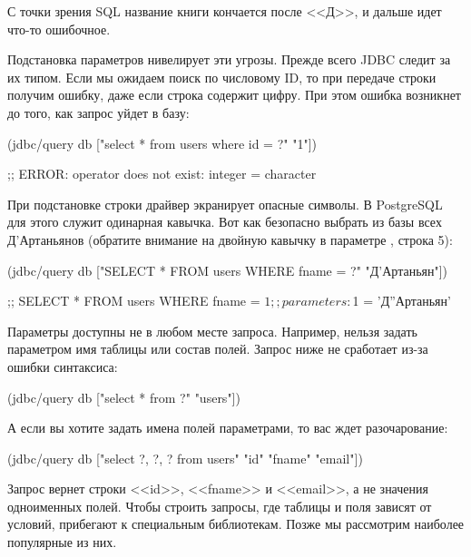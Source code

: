 С точки зрения SQL название книги кончается после <<Д>>, и дальше идет что-то ошибочное.

Подстановка параметров нивелирует эти угрозы. Прежде всего JDBC следит за их типом. Если мы ожидаем поиск по числовому ID, то при передаче строки получим ошибку, даже если строка содержит цифру. При этом ошибка возникнет до того, как запрос уйдет в базу:

\begin{english}
  \begin{clojure}
(jdbc/query db ["select * from users where id = ?" "1"])

;; ERROR: operator does not exist: integer = character
  \end{clojure}
\end{english}

При подстановке строки драйвер экранирует опасные символы. В PostgreSQL для этого служит одинарная кавычка. Вот как безопасно выбрать из базы всех Д'Артаньянов (обратите внимание на двойную кавычку в параметре , строка 5):

  \begin{clojure/lines}
(jdbc/query db
  ["SELECT * FROM users WHERE fname = ?" "Д'Артаньян"])

;; SELECT * FROM users WHERE fname = $1
;; parameters: $1 = 'Д''Артаньян'
  \end{clojure/lines}

Параметры доступны не в любом месте запроса. Например, нельзя задать параметром имя таблицы или состав полей. Запрос ниже не сработает из-за ошибки синтаксиса:

\begin{english}
  \begin{clojure}
(jdbc/query db ["select * from ?" "users"])
  \end{clojure}
\end{english}

А если вы хотите задать имена полей параметрами, то вас ждет разочарование:

\begin{english}
  \begin{clojure}
(jdbc/query db
  ["select ?, ?, ? from users" "id" "fname" "email"])
  \end{clojure}
\end{english}

Запрос вернет строки <<id>>, <<fname>> и <<email>>, а не значения одноименных полей. Чтобы строить запросы, где таблицы и поля зависят от условий, прибегают к специальным библиотекам. Позже мы рассмотрим наиболее популярные из них.

